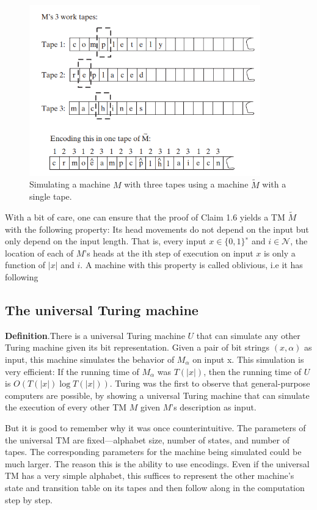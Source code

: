 \documentclass[a4paper,12pt]{article}
\begin{document}
\begin{figure}[!ht]
\centering
\includegraphics[width=10cm]{s2.png}
\caption{Simulating a machine $M$ with three tapes using a machine $\widetilde{M}$ with a single tape.}
\label{fig:scetch2}
\end{figure}

With a bit of care, one can ensure that the proof of Claim 1.6 yields a TM $\widetilde{M}$ with the following property: Its head movements do not depend on the input but only depend on
the input length. That is, every input $x \in \{0, 1\}^{∗}$ and $i \in \mathcal{N}$, the location of each of $M$’s
heads at the ith step of execution on input $x$ is only a function of $|x|$ and $i$. A machine
with this property is called oblivious, i.e it has following 

\subsection{The universal Turing machine}
\textbf{Definition}.There is a universal Turing machine $U$ that can simulate any other Turing machine given
its bit representation. Given a pair of bit strings $(x, \alpha)$ as input, this machine simulates
the behavior of $M_\alpha$ on input x. This simulation is very efficient: If the running time of
$M_\alpha$ was $T(|x|)$, then the running time of $U$ is $O(T(|x|) \log{T(|x|)})$.
Turing was the first to observe that general-purpose computers are possible, by showing
a universal Turing machine that can simulate the execution of every other TM $M$ given
$M$’s description as input.

But it is
good to remember why it was once counterintuitive. The parameters of the universal
TM are fixed—alphabet size, number of states, and number of tapes. The corresponding
parameters for the machine being simulated could be much larger. The reason this is the ability to use encodings. Even if the universal TM has a
very simple alphabet, this suffices to represent the other machine’s state and transition
table on its tapes and then follow along in the computation step by step.
\end{document}
